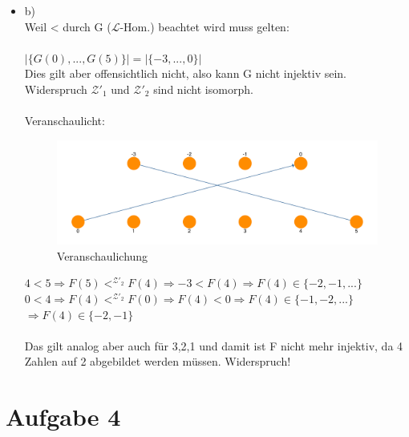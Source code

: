 \documentclass[a4paper]{scrartcl}
\begin{document}
\begin{itemize}
        \item b)\\
            Weil < durch G ($\mathscr{L}$-Hom.) beachtet wird muss gelten:\\
            \\$|\{G(0),..., G(5)\}| = |\{-3,...,0\}|$\\
            Dies gilt aber offensichtlich nicht, also kann G nicht injektiv sein.\\
            Widerspruch $\mathscr{Z'}_1$ und $\mathscr{Z'}_2$ sind nicht isomorph.\\

            \\Veranschaulicht:\\
            \begin{figure}[H]
                \centering
                \includegraphics[scale=0.3]{./3-b-drawing.pdf}
                \caption{Veranschaulichung}
                \label{fig:name}
            \end{figure}

            $4 < 5 \Rightarrow F(5) <^{\mathscr{Z'}_2} F(4) \Rightarrow -3 < F(4) \Rightarrow F(4) \in \{-2,-1,...\}$\\
            $0 < 4 \Rightarrow F(4) <^{\mathscr{Z'}_2} F(0) \Rightarrow F(4) < 0 \Rightarrow F(4) \in \{-1,-2,...\}$\\
            $\Rightarrow F(4) \in \{-2,-1\}$\\
            \\Das gilt analog aber auch für 3,2,1 und damit ist F nicht mehr injektiv, da 4 Zahlen auf 2 abgebildet werden müssen.
            Widerspruch!

    \end{itemize}

\section*{Aufgabe 4}%
\label{sec:aufgabe_4}
\end{document}
